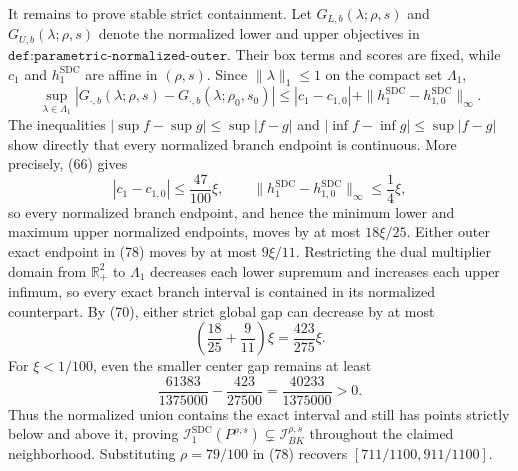 It remains to prove stable strict containment.  Let \(G_{L,b}(\lambda;\rho,s)\) and \(G_{U,b}(\lambda;\rho,s)\) denote the normalized lower and upper objectives in \(\texttt{def:parametric-normalized-outer}\).  Their box terms and scores are fixed, while \(c_1\) and \(h_1^{\mathrm{SDC}}\) are affine in \((\rho,s)\).  Since \(\|\lambda\|_1\le1\) on the compact set \(\Lambda_1\),
\[
 \sup_{\lambda\in\Lambda_1}
 |G_{\cdot,b}(\lambda;\rho,s)-G_{\cdot,b}(\lambda;\rho_0,s_0)|
 \le |c_1-c_{1,0}|+\|h_1^{\mathrm{SDC}}-h_{1,0}^{\mathrm{SDC}}\|_\infty.    \tag{79}
\]
The inequalities \(|\sup f-\sup g|\le\sup|f-g|\) and \(|\inf f-\inf g|\le\sup|f-g|\) show directly that every normalized branch endpoint is continuous.  More precisely, (66) gives
\[
 |c_1-c_{1,0}|\le\frac{47}{100}\xi,
 \qquad
 \|h_1^{\mathrm{SDC}}-h_{1,0}^{\mathrm{SDC}}\|_\infty\le\frac14\xi,         \tag{80}
\]
so every normalized branch endpoint, and hence the minimum lower and maximum upper normalized endpoints, moves by at most \(18\xi/25\).  Either outer exact endpoint in (78) moves by at most \(9\xi/11\).  Restricting the dual multiplier domain from \(\mathbb R_+^2\) to \(\Lambda_1\) decreases each lower supremum and increases each upper infimum, so every exact branch interval is contained in its normalized counterpart.  By (70), either strict global gap can decrease by at most
\[
 \left(\frac{18}{25}+\frac9{11}\right)\xi=\frac{423}{275}\xi.               \tag{81}
\]
For \(\xi<1/100\), even the smaller center gap remains at least
\[
 \frac{61383}{1375000}-\frac{423}{27500}
 =\frac{40233}{1375000}>0.                                                    \tag{82}
\]
Thus the normalized union contains the exact interval and still has points strictly below and above it, proving
\(\mathcal I_1^{\mathrm{SDC}}(P^{\rho,s})\subsetneq\mathcal I_{BK}^{\rho,s}\) throughout the claimed neighborhood.  Substituting \(\rho=79/100\) in (78) recovers \([711/1100,911/1100]\).
